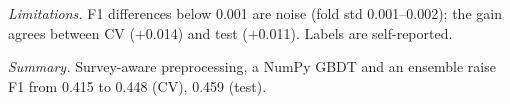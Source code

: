 \documentclass[10pt,conference,compsocconf]{IEEEtran}
\begin{document}
\emph{Limitations.} F1 differences below 0.001 are noise (fold std 0.001--0.002); the gain agrees between CV (+0.014) and test (+0.011). Labels are self-reported.

\emph{Summary.} Survey-aware preprocessing, a NumPy GBDT and an ensemble raise F1 from 0.415 to 0.448 (CV), 0.459 (test).



\end{document}
